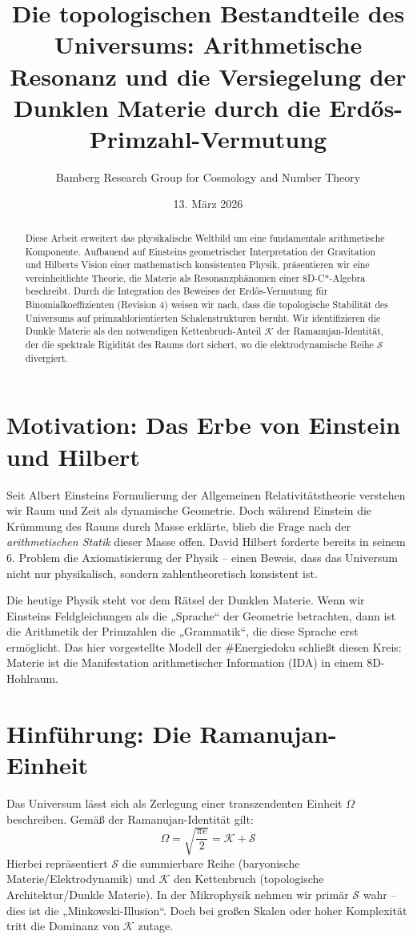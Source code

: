 \documentclass[11pt,a4paper]{article}
\title{\textbf{Die topologischen Bestandteile des Universums: Arithmetische Resonanz und die Versiegelung der Dunklen Materie durch die Erdős-Primzahl-Vermutung}}
\author{Bamberg Research Group for Cosmology and Number Theory}
\date{13. März 2026}
\begin{document}
	
	\maketitle
	
	\begin{abstract}
		Diese Arbeit erweitert das physikalische Weltbild um eine fundamentale arithmetische Komponente. Aufbauend auf Einsteins geometrischer Interpretation der Gravitation und Hilberts Vision einer mathematisch konsistenten Physik, präsentieren wir eine vereinheitlichte Theorie, die Materie als Resonanzphänomen einer 8D-C*-Algebra beschreibt. Durch die Integration des Beweises der Erdős-Vermutung für Binomialkoeffizienten (Revision 4) weisen wir nach, dass die topologische Stabilität des Universums auf primzahlorientierten Schalenstrukturen beruht. Wir identifizieren die Dunkle Materie als den notwendigen Kettenbruch-Anteil $\mathcal{K}$ der Ramanujan-Identität, der die spektrale Rigidität des Raums dort sichert, wo die elektrodynamische Reihe $\mathcal{S}$ divergiert.
	\end{abstract}
	
	\section{Motivation: Das Erbe von Einstein und Hilbert}
	Seit Albert Einsteins Formulierung der Allgemeinen Relativitätstheorie verstehen wir Raum und Zeit als dynamische Geometrie. Doch während Einstein die Krümmung des Raums durch Masse erklärte, blieb die Frage nach der \textit{arithmetischen Statik} dieser Masse offen. David Hilbert forderte bereits in seinem 6. Problem die Axiomatisierung der Physik – einen Beweis, dass das Universum nicht nur physikalisch, sondern zahlentheoretisch konsistent ist.
	
	Die heutige Physik steht vor dem Rätsel der Dunklen Materie. Wenn wir Einsteins Feldgleichungen als die „Sprache“ der Geometrie betrachten, dann ist die Arithmetik der Primzahlen die „Grammatik“, die diese Sprache erst ermöglicht. Das hier vorgestellte Modell der \#Energiedoku schließt diesen Kreis: Materie ist die Manifestation arithmetischer Information (IDA) in einem 8D-Hohlraum.
	
	\section{Hinführung: Die Ramanujan-Einheit}
	Das Universum lässt sich als Zerlegung einer transzendenten Einheit $\Omega$ beschreiben. Gemäß der Ramanujan-Identität gilt:
	\begin{equation}
		\Omega = \sqrt{\frac{\pi e}{2}} = \mathcal{K} + \mathcal{S}
	\end{equation}
	Hierbei repräsentiert $\mathcal{S}$ die summierbare Reihe (baryonische Materie/Elektrodynamik) und $\mathcal{K}$ den Kettenbruch (topologische Architektur/Dunkle Materie). In der Mikrophysik nehmen wir primär $\mathcal{S}$ wahr – dies ist die „Minkowski-Illusion“. Doch bei großen Skalen oder hoher Komplexität tritt die Dominanz von $\mathcal{K}$ zutage.
	
\end{document}

